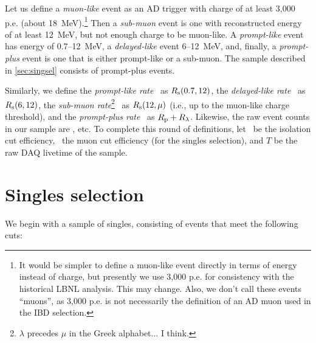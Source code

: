 \documentclass[../thesis.tex]{subfiles}
\begin{document}
Let us define a \emph{muon-like} event as an AD trigger with charge of at least
3,000 p.e. (about 18~MeV).\footnote{It would be simpler to define a muon-like
  event directly in terms of energy instead of charge, but presently we use
  3,000 p.e. for consistency with the historical LBNL analysis. This may change.
  Also, we don't call these events ``muons'', as 3,000 p.e. is not necessarily
  the definition of an AD muon used in the IBD selection.} Then a
\emph{sub-muon} event is one with reconstructed energy of at least 12~MeV, but
not enough charge to be muon-like. A \emph{prompt-like} event has energy of
0.7--12~MeV, a \emph{delayed-like} event 6--12~MeV, and, finally, a
\emph{prompt-plus} event is one that is either prompt-like or a sub-muon. The
sample described in \autoref{sec:singsel} consists of prompt-plus events.

Similarly, we define the \emph{prompt-like rate} \Rpro\ as $R_\mathrm{s}(0.7, 12)$, the
\emph{delayed-like rate} \Rdel\ as $R_\mathrm{s}(6, 12)$, the \emph{sub-muon
  rate}\footnote{$\lambda$ precedes $\mu$ in the Greek alphabet... I think.}
\Rsub\ as $R_\mathrm{s}(12, \mu)$ (i.e., up to the muon-like charge threshold), and the
\emph{prompt-plus rate} \Rplu\ as $R_\mathrm{p} + R_\mathrm{\lambda}$. Likewise, the raw event
counts in our sample are \Npro, etc. To complete this round of definitions, let
\eisol\ be the isolation cut efficiency, \emu\ the muon cut efficiency (for the
singles selection), and $T$ be the raw DAQ livetime of the sample.

\section{Singles selection}
\label{sec:singsel}

We begin with a sample of singles, consisting of events that meet the following
cuts:

\end{document}
